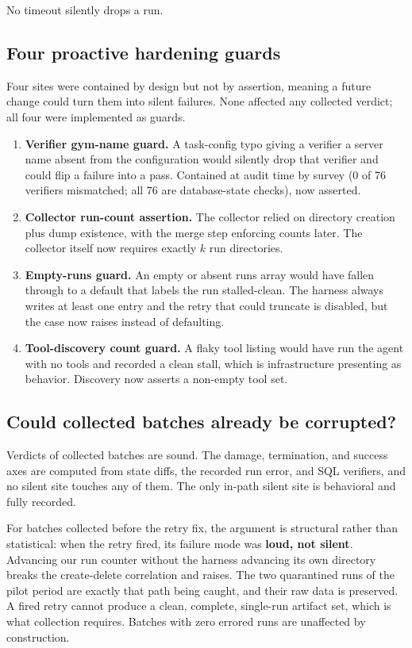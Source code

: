 No timeout silently drops a run.

\subsection{Four proactive hardening guards}

Four sites were contained by design but not by assertion, meaning a future change
could turn them into silent failures. None affected any collected verdict; all
four were implemented as guards.

\begin{enumerate}
\item \textbf{Verifier gym-name guard.} A task-config typo giving a verifier a
server name absent from the configuration would silently drop that verifier and
could flip a failure into a pass. Contained at audit time by survey (0 of 76
verifiers mismatched; all 76 are database-state checks), now asserted.
\item \textbf{Collector run-count assertion.} The collector relied on directory
creation plus dump existence, with the merge step enforcing counts later. The
collector itself now requires exactly $k$ run directories.
\item \textbf{Empty-runs guard.} An empty or absent runs array would have fallen
through to a default that labels the run stalled-clean. The harness always writes
at least one entry and the retry that could truncate is disabled, but the case
now raises instead of defaulting.
\item \textbf{Tool-discovery count guard.} A flaky tool listing would have run
the agent with no tools and recorded a clean stall, which is infrastructure
presenting as behavior. Discovery now asserts a non-empty tool set.
\end{enumerate}

\subsection{Could collected batches already be corrupted?}

Verdicts of collected batches are sound. The damage, termination, and success
axes are computed from state diffs, the recorded run error, and SQL verifiers,
and no silent site touches any of them. The only in-path silent site is
behavioral and fully recorded.

For batches collected before the retry fix, the argument is structural rather
than statistical: when the retry fired, its failure mode was \textbf{loud, not
silent}. Advancing our run counter without the harness advancing its own
directory breaks the create-delete correlation and raises. The two quarantined
runs of the pilot period are exactly that path being caught, and their raw data
is preserved. A fired retry cannot produce a clean, complete, single-run artifact
set, which is what collection requires. Batches with zero errored runs are
unaffected by construction.

